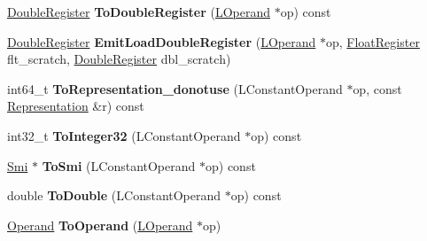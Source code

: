 \begin{DoxyCompactItemize}
\item 
\hyperlink{structv8_1_1internal_1_1_double_register}{Double\+Register} {\bfseries To\+Double\+Register} (\hyperlink{classv8_1_1internal_1_1_l_operand}{L\+Operand} $\ast$op) const \hypertarget{classv8_1_1internal_1_1_l_code_gen_aad85fae6ac6f5060e2d7b220ab87ede4}{}\label{classv8_1_1internal_1_1_l_code_gen_aad85fae6ac6f5060e2d7b220ab87ede4}

\item 
\hyperlink{structv8_1_1internal_1_1_double_register}{Double\+Register} {\bfseries Emit\+Load\+Double\+Register} (\hyperlink{classv8_1_1internal_1_1_l_operand}{L\+Operand} $\ast$op, \hyperlink{structv8_1_1internal_1_1_double_register}{Float\+Register} flt\+\_\+scratch, \hyperlink{structv8_1_1internal_1_1_double_register}{Double\+Register} dbl\+\_\+scratch)\hypertarget{classv8_1_1internal_1_1_l_code_gen_a55d837bcf3293f71a942750fd8c28022}{}\label{classv8_1_1internal_1_1_l_code_gen_a55d837bcf3293f71a942750fd8c28022}

\item 
int64\+\_\+t {\bfseries To\+Representation\+\_\+donotuse} (L\+Constant\+Operand $\ast$op, const \hyperlink{classv8_1_1internal_1_1_representation}{Representation} \&r) const \hypertarget{classv8_1_1internal_1_1_l_code_gen_a491c78ceba6eae1cba0e0d4e0d28ed1a}{}\label{classv8_1_1internal_1_1_l_code_gen_a491c78ceba6eae1cba0e0d4e0d28ed1a}

\item 
int32\+\_\+t {\bfseries To\+Integer32} (L\+Constant\+Operand $\ast$op) const \hypertarget{classv8_1_1internal_1_1_l_code_gen_a477ff533f07d93b0e1ca5f9290beea36}{}\label{classv8_1_1internal_1_1_l_code_gen_a477ff533f07d93b0e1ca5f9290beea36}

\item 
\hyperlink{classv8_1_1internal_1_1_smi}{Smi} $\ast$ {\bfseries To\+Smi} (L\+Constant\+Operand $\ast$op) const \hypertarget{classv8_1_1internal_1_1_l_code_gen_a9aa0394d9bdd7a07b4190d08edb0a8e6}{}\label{classv8_1_1internal_1_1_l_code_gen_a9aa0394d9bdd7a07b4190d08edb0a8e6}

\item 
double {\bfseries To\+Double} (L\+Constant\+Operand $\ast$op) const \hypertarget{classv8_1_1internal_1_1_l_code_gen_a9859cf602181324ec10970ab93416aaa}{}\label{classv8_1_1internal_1_1_l_code_gen_a9859cf602181324ec10970ab93416aaa}

\item 
\hyperlink{classv8_1_1internal_1_1_operand}{Operand} {\bfseries To\+Operand} (\hyperlink{classv8_1_1internal_1_1_l_operand}{L\+Operand} $\ast$op)\hypertarget{classv8_1_1internal_1_1_l_code_gen_aadfda9a2906fe2eea56eb9e3c2a4c054}{}\label{classv8_1_1internal_1_1_l_code_gen_aadfda9a2906fe2eea56eb9e3c2a4c054}


\end{DoxyCompactItemize}
